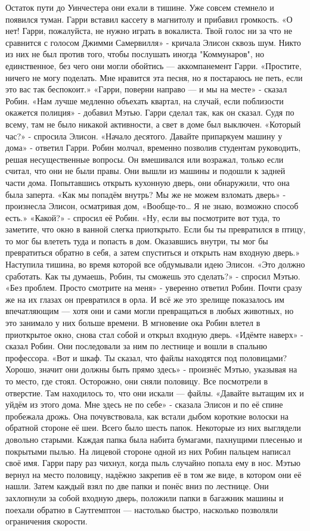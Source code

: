 \documentclass[a4paper,12pt]{book}
\begin{document}
	Остаток пути до Уинчестера они ехали в тишине. Уже совсем стемнело и появился туман. Гарри вставил кассету в магнитолу и прибавил громкость.
	«О нет! Гарри, пожалуйста, не нужно играть в вокалиста. Твой голос ни за что не сравнится с голосом Джимми Самервилля» - кричала Элисон сквозь шум. Никто из них не был против того, чтобы послушать иногда "Коммунаров", но единственное, без чего они могли обойтись — аккомпанемент Гарри.
	«Простите, ничего не могу поделать. Мне нравится эта песня, но я постараюсь не петь, если это вас так беспокоит.»
	«Гарри, поверни направо — и мы на месте» - сказал Робин.
	«Нам лучше медленно объехать квартал, на случай, если поблизости окажется полиция» - добавил Мэтью.
	Гарри сделал так, как он сказал. Судя по всему, там не было никакой активности, а свет в доме был выключен.
	«Который час?» - спросила Элисон.
	«Начало десятого. Давайте припаркуем машину у дома» - ответил Гарри.
	Робин молчал, временно позволив студентам руководить, решая несущественные вопросы. Он вмешивался или возражал, только если считал, что они не были правы.
	Они вышли из машины и подошли к задней части дома. Попытавшись открыть кухонную дверь, они обнаружили, что она была заперта.
	«Как мы попадём внутрь? Мы же не можем взломать дверь» - произнесла Элисон, осматривая дом,
	«Вообще-то… Я не знаю, возможно способ есть.»
	«Какой?» - спросил её Робин.	
	«Ну, если вы посмотрите вот туда, то заметите, что окно в ванной слегка приоткрыто. Если бы ты превратился в птицу, то мог бы влететь туда и попасть в дом. Оказавшись внутри, ты мог бы превратиться обратно в себя, а затем спуститься и открыть нам входную дверь.»
	Наступила тишина, во время которой все обдумывали идею Элисон.
	«Это должно сработать. Как ты думаешь, Робин, ты сможешь это сделать?» - спросил Мэтью.
	«Без проблем. Просто смотрите на меня» - уверенно ответил Робин. Почти сразу же на их глазах он превратился в орла. И всё же это зрелище показалось им впечатляющим — хотя они и сами могли превращаться в любых животных, но это занимало у них больше времени.
	В мгновение ока Робин влетел в приоткрытое окно, снова стал собой и открыл входную дверь.
	«Идёмте наверх» - сказал Робин.
	Они последовали за ним по лестнице и вошли в спальню профессора.
	«Вот и шкаф. Ты сказал, что файлы находятся под половицами? Хорошо, значит они должны быть прямо здесь» - произнёс Мэтью, указывая на то место, где стоял.
	Осторожно, они сняли половицу. Все посмотрели в отверстие. Там находилось то, что они искали — файлы.
	«Давайте вытащим их и уйдём из этого дома. Мне здесь не по себе» - сказала Элисон и по её спине пробежала дрожь. Она почувствовала, как встали дыбом короткие волоски на обратной стороне её шеи.
	Всего было шесть папок. Некоторые из них выглядели довольно старыми. Каждая папка была набита бумагами, пахнущими плесенью и покрытыми пылью. На лицевой стороне одной из них Робин пальцем написал своё имя. Гарри пару раз чихнул, когда пыль случайно попала ему в нос.
	Мэтью вернул на место половицу, надёжно закрепив её в том же виде, в котором они её нашли. Затем каждый взял по две папки и понёс вниз по лестнице. Они захлопнули за собой входную дверь, положили папки в багажник машины и поехали обратно в Саутгемптон — настолько быстро, насколько позволяли ограничения скорости.
\end{document}
